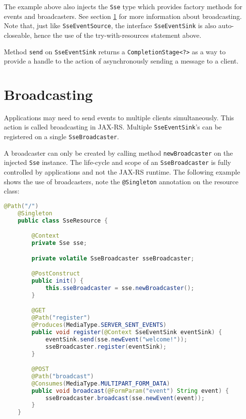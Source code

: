 The example above also injects the \lstinline{Sse} type which provides factory methods for events and broadcasters. See
section \ref{sse_broadcasting} for more information about broadcasting. Note that, just like \lstinline{SseEventSource},
the interface \lstinline{SseEventSink} is also auto-closeable, hence the use of the try-with-resources statement
above.

Method \lstinline{send} on \lstinline{SseEventSink} returns a \lstinline{CompletionStage<?>} as a way to provide a
handle to the action of asynchronously sending a message to a client.

\section{Broadcasting}
\label{sse_broadcasting}

Applications may need to send events to multiple clients simultaneously. This action is called broadcasting in JAX-RS.
Multiple \lstinline{SseEventSink}'s can be registered on a single \lstinline{SseBroadcaster}.

A broadcaster can only be created by calling method \lstinline{newBroadcaster} on the injected \lstinline{Sse} instance.
The life-cycle and scope of an \lstinline{SseBroadcaster} is fully controlled by applications and not the JAX-RS
runtime. The following example shows the use of broadcasters, note the \lstinline{@Singleton} annotation on the resource
class:

\begin{lstlisting}[language=Java]
    @Path("/") 
    @Singleton
    public class SseResource {

        @Context
        private Sse sse;

        private volatile SseBroadcaster sseBroadcaster;

        @PostConstruct
        public init() {
            this.sseBroadcaster = sse.newBroadcaster();
        }  

        @GET
        @Path("register")
        @Produces(MediaType.SERVER_SENT_EVENTS)
        public void register(@Context SseEventSink eventSink) {
            eventSink.send(sse.newEvent("welcome!"));
            sseBroadcaster.register(eventSink);
        }  

        @POST
        @Path("broadcast")
        @Consumes(MediaType.MULTIPART_FORM_DATA)
        public void broadcast(@FormParam("event") String event) { 
            sseBroadcaster.broadcast(sse.newEvent(event));
        } 
    }
\end{lstlisting}

